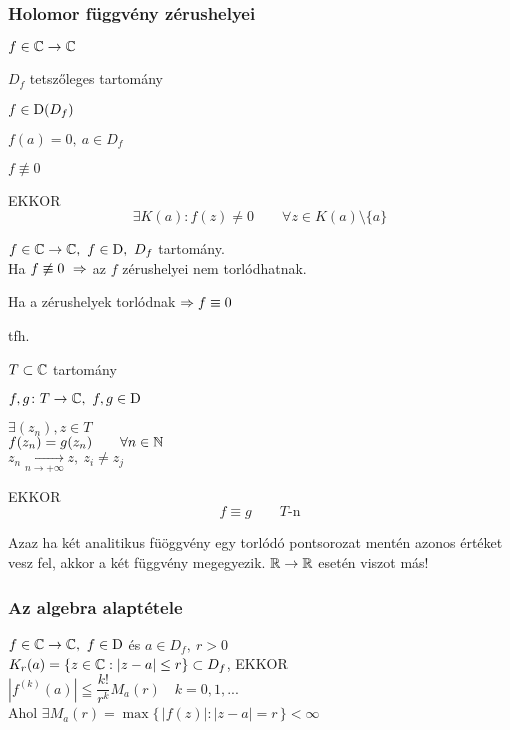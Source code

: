 \subsubsection{Holomor függvény zérushelyei}
\begin{te}
  $f\in\mathbb{C}\to\mathbb{C}$
  \begin{enumzjr}
  \item $D_f$ tetszőleges tartomány
  \item $f\in\operatorname{D}(D_f)$
  \item $f(a)=0,\ a\in D_f$
  \item $f\not\equiv 0$
\end{enumzjr}
EKKOR\\
\[\exists K(a)\colon f(z) \neq 0\qquad \forall z\in K(a)\setminus\{a\}\]
\end{te}

\begin{te}
  $f\in\mathbb{C}\to\mathbb{C},\ f\in \operatorname{D},\ D_f$ tartomány.\\
  Ha $f\not\equiv 0\ \Rightarrow$ az $f$ zérushelyei nem torlódhatnak.
\end{te}
\begin{megj}
  Ha a zérushelyek torlódnak $\Rightarrow f \equiv 0$
\end{megj}
\begin{te} tfh.
  \begin{enumzjr}
  \item $T\subset \mathbb{C}$ tartomány
  \item $f,g\colon T\to\mathbb{C},\ f,g\in \operatorname{D}$
  \item $\exists (z_n), z\in T$\\
    $f(z_n) = g(z_n)\qquad \forall n \in \mathbb{N}$\\
    $z_n\xrightarrow[n\to+\infty]{} z,\ z_i\neq z_j$
  \end{enumzjr}  
  EKKOR
  \[f\equiv g \qquad T\text{-n}\]
\end{te}

\begin{megj}
  Azaz ha két analitikus füöggvény egy torlódó pontsorozat mentén azonos értéket vesz fel, akkor a két függvény
  megegyezik. $\mathbb{R}\to\mathbb{R}$ esetén viszot más!
\end{megj}



\subsubsection{Az algebra alaptétele}

\begin{lemma}
  $f\in\mathbb{C}\to\mathbb{C},\ f\in\operatorname{D}$ és $a\in D_f,\ r>0$\\
  $K_r(a)= \{z\in\mathbb{C} : |z-a| \leq r \} \subset D_f $, EKKOR\\
  $\left|f^{(k)}(a) \right| \leqq \dfrac{k!}{r^k} M_a(r)\quad k=0,1,...$\\
  Ahol $\exists M_a(r) = \max \{\, |f(z)| : |z-a| = r \,\} < \infty$
\end{lemma}

